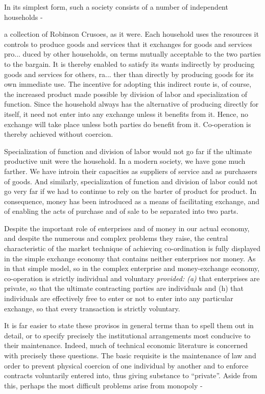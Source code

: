 \documentclass[11pt,openany]{book}
\begin{document}
In its simplest form, such a society consists of a number of independent households -

a collection of Robinson Crusoes, as it were. Each household uses the resources it controls to produce goods and services that it exchanges for goods and services pro... duced by other households, on terms mutually acceptable to the two parties to the bargain. It is thereby enabled to satisfy its wants indirectly by producing goods and services for others, ra... ther than directly by producing goods for its own immediate use. The incentive for adopting this indirect route is, of course, the increased product made possible by division of labor and specialization of function. Since the household always has the alternative of producing directly for itself, it need not enter into any exchange unless it benefits from it. Hence, no exchange will take place unless both parties do benefit from it. Co-operation is thereby achieved without coercion.

Specialization of function and division of labor would not go far if the ultimate productive unit were the household. In a modern society, we have gone much farther. We have introin their capacities as suppliers of service and as purchasers of goods. And similarly, specialization of function and division of labor could not go very far if we had to continue to rely on the barter of product for product. In consequence, money has been introduced as a means of facilitating exchange, and of enabling the acts of purchase and of sale to be separated into two parts.

Despite the important role of enterprises and of money in our actual economy, and despite the numerous and complex problems they raise, the central characteristic of the market technique of achieving co-ordination is fully displayed in the simple exchange economy that contains neither enterprises nor money. As in that simple model, so in the complex enterprise and money-exchange economy, co-operation is strictly individual and voluntary \emph{provided: (a)} that enterprises are private, so that the ultimate contracting parties are individuals and (h) that individuals are effectively free to enter or not to enter into any particular exchange, so that every transaction is strictly voluntary.

It is far easier to state these provisos in general terms than to spell them out in detail, or to specify precisely the institutional arrangements most conducive to their maintenance. Indeed, much of technical economic literature is concerned with precisely these questions. The basic requisite is the maintenance of law and order to prevent physical coercion of one individual by another and to enforce contracts voluntarily entered into, thus giving substance to ``private''. Aside from this, perhaps the most difficult problems arise from monopoly -
\end{document}
